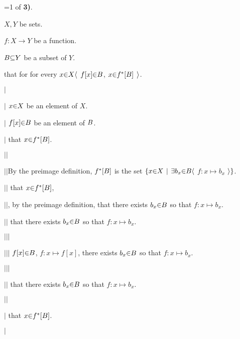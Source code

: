=1
\vs
{} of {\bf 3)}. \par
{} $X,Y$ be sets. \par
{} $f: X \to Y$ be a function. \par
{} $\b B \p\subseteq Y$ be a subset of $Y$. \par
{} that for for every $x \p\in X \a\langle$  $f[x] \p\in \b B$,  $x \p\in f^*[\b B]$ $\a\rangle$. \par

  $|$\hs \par
  $|$\hs {} $x \p\in X$ be an element of $X$. \par
  $|$\hs {} $f[x] \p\in \b B$ be an element of $\b B$. \par
  $|$\hs {} that $x \p\in f^*[\b B]$. \par

    $|$\hs$|$\hs \par
    $|$\hs$|$\hs By the preimage definition, $f^*[\b B]$ is the set $\a\{x \p\in X \pipe \a\exists b_x \p\in \b B \a\langle$ $f: x \mapsto b_x$ $\a\rangle \a\}$. \par
    $|$\hs$|$\hs {}  that $x \p\in f^*[\b B]$, \par
    $|$\hs$|$\hs {}, by the preimage definition,  that there exists $b_x \p\in \b B$ so that $f: x \mapsto b_x$. \par
    $|$\hs$|$\hs {} that there exists $b_x \p\in \b B$ so that $f: x \mapsto b_x$. \par

      $|$\hs$|$\hs$|$\hs \par
      $|$\hs$|$\hs$|$\hs {} $f[x] \p\in \b B$,  $f: x \mapsto f[x]$,  there exists $b_x \p\in \b B$ so that $f: x \mapsto b_x$. \par
      $|$\hs$|$\hs$|$\hs \par

    $|$\hs$|$\hs {} that there exists $b_x \p\in \b B$ so that $f: x \mapsto b_x$. \par
    $|$\hs$|$\hs \par

  $|$\hs {} that $x \p\in f^*[\b B]$. \par
  $|$\hs \par

